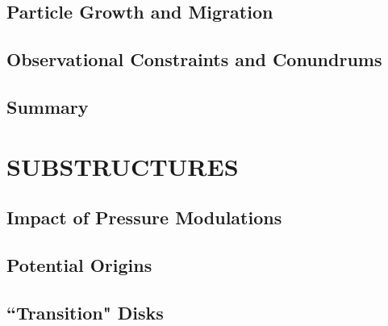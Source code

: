 \documentclass[a4paper]{ar-1col}
\begin{document}

\subsection{Particle Growth and Migration}

\subsection{Observational Constraints and Conundrums}



\subsection{Summary}



\section{SUBSTRUCTURES} \label{sec:substructures}

\subsection{Impact of Pressure Modulations}

\subsection{Potential Origins}

\subsection{``Transition" Disks}
\end{document}
